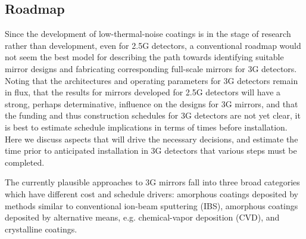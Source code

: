 
\subsection{Roadmap}
Since the development of low-thermal-noise coatings is in the stage of research rather than development, even for 2.5G detectors, a conventional roadmap would not seem the best model for describing the path towards identifying suitable mirror designs and fabricating corresponding full-scale mirrors for 3G detectors. Noting that the architectures and operating parameters for 3G detectors remain in flux, that the results for mirrors developed for 2.5G detectors will have a strong, perhaps determinative, influence on the designs for 3G mirrors, and that the funding and thus construction schedules for 3G detectors are not yet clear, it is best to estimate schedule implications in terms of times before installation. Here we discuss aspects that will drive the necessary decisions, and estimate the time prior to anticipated installation in 3G detectors that various steps must be completed. 

The currently plausible approaches to 3G mirrors fall into three broad categories which have different cost and schedule drivers: amorphous coatings deposited by methods similar to conventional ion-beam sputtering (IBS), amorphous coatings deposited by alternative means, e.g. chemical-vapor deposition (CVD), and crystalline coatings. 

